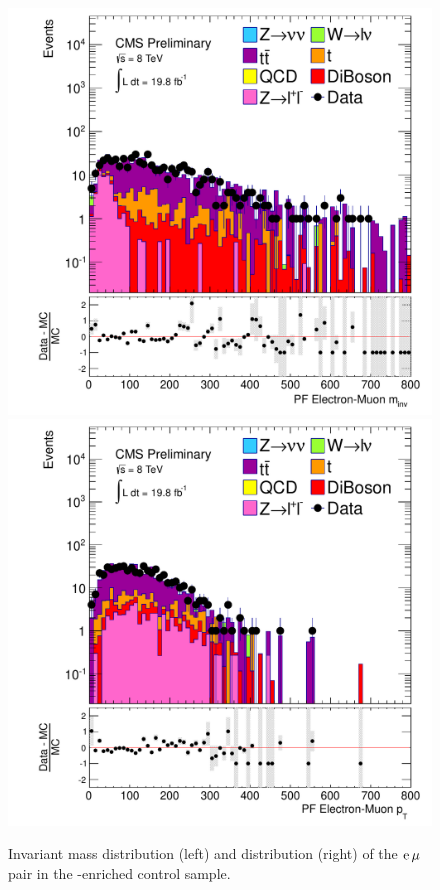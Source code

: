 \begin{figure}[htbp!]
\begin{center}
  \includegraphics[scale=0.35]{Figures/sus13009/PFElecMuonMass.pdf} 
    \includegraphics[scale=0.35]{Figures/sus13009/PFElecMuonPt.pdf}
\caption{Invariant mass distribution (left) and \pt distribution (right) of the $\mathrm{e}\,\mu$ pair in the \ttbar-enriched control sample.}
\label{ttbar}
\end{center}
\end{figure}



